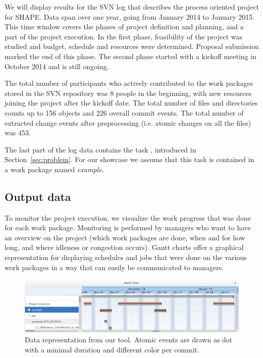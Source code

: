 We will display results for the SVN log that describes the process oriented project for SHAPE. Data span over one year, going from January 2014 to January 2015. This time window covers the phases of project definition and planning, and a part of the project execution. In the first phase, feasibility of the project was studied and budget, schedule and resources were determined. Proposal submission marked the end of this phase. The second phase started with a kickoff meeting in October 2014 and is still ongoing.

The total number of participants who actively contributed to the work packages stored in the SVN repository was 8 people in the beginning, with new resources joining the project after the kickoff date. The total number of files and directories counts up to 156 objects and 226 overall commit events. The total number of extracted change events after preprocessing (i.e. atomic changes on all the files) was 453.

The last part of the log data contains the task , introduced in Section~\ref{sec:problem}. For our showcase we assume that this task is contained in a work package named \emph{example}.

\subsection{Output data}

To monitor the project execution, we visualize the work progress that was done for each work package. Monitoring is performed by managers who want to have an overview on the project (which work packages are done, when and for how long, and where idleness or congestion occurs). Gantt charts offer a graphical representation for displaying schedules and jobs that were done on the various work packages \cite{wilson2003gantt} in a way that can easily be communicated to managers.

\begin{figure}
\centering
\includegraphics[width=\textwidth]{bpm2015/imgs/aggregation_and_not}
\caption{Data representation from our tool. Atomic events are drawn as dot with a minimal duration and different color per commit. }
\label{fig:example-screenshot}
\end{figure}

